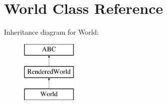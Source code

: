 \hypertarget{classworld_1_1_world}{}\section{World Class Reference}
\label{classworld_1_1_world}
Inheritance diagram for World\+:\begin{figure}[H]
\begin{center}
\leavevmode
\includegraphics[height=3.000000cm]{classworld_1_1_world}
\end{center}
\end{figure}
